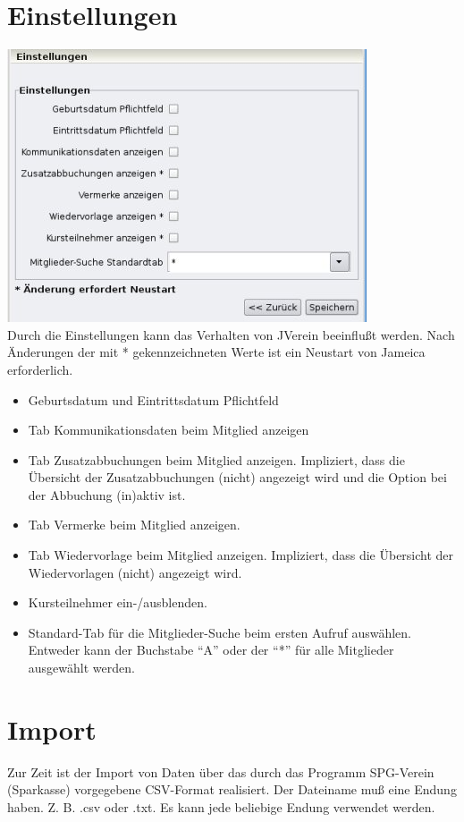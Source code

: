 \documentclass[a4paper,BCOR30mm,DIV14,pdftex,liststotoc,footsepline,openany]{scrbook}
\begin{document}
\section{Einstellungen}
\label{einstellungen}
\includegraphics{./screenshots/einstellungen.jpg}\\
Durch die Einstellungen kann das Verhalten von JVerein beeinflußt werden. Nach Änderungen der mit * gekennzeichneten Werte
ist ein Neustart von Jameica erforderlich.\\

\begin{itemize}
 \item Geburtsdatum und Eintrittsdatum Pflichtfeld
 \item Tab Kommunikationsdaten beim Mitglied anzeigen
 \item Tab Zusatzabbuchungen beim Mitglied anzeigen. Impliziert, dass die Übersicht der Zusatzabbuchungen (nicht) angezeigt
       wird und die Option bei der Abbuchung (in)aktiv ist.
 \item Tab Vermerke beim Mitglied anzeigen.
 \item Tab Wiedervorlage beim Mitglied anzeigen. Impliziert, dass die Übersicht der Wiedervorlagen (nicht) angezeigt wird. 
 \item Kursteilnehmer ein-/ausblenden. 
 \item Standard-Tab für die Mitglieder-Suche beim ersten Aufruf auswählen. Entweder kann der Buchstabe ``A'' oder der ``*'' für alle Mitglieder
       ausgewählt werden.
\end{itemize}


\section{Import}
Zur Zeit ist der Import von Daten über das durch das Programm SPG-Verein (Sparkasse) vorgegebene CSV-Format realisiert. Der Dateiname muß eine Endung haben. Z. B. .csv oder .txt. Es kann jede beliebige Endung verwendet werden.
\end{document}
